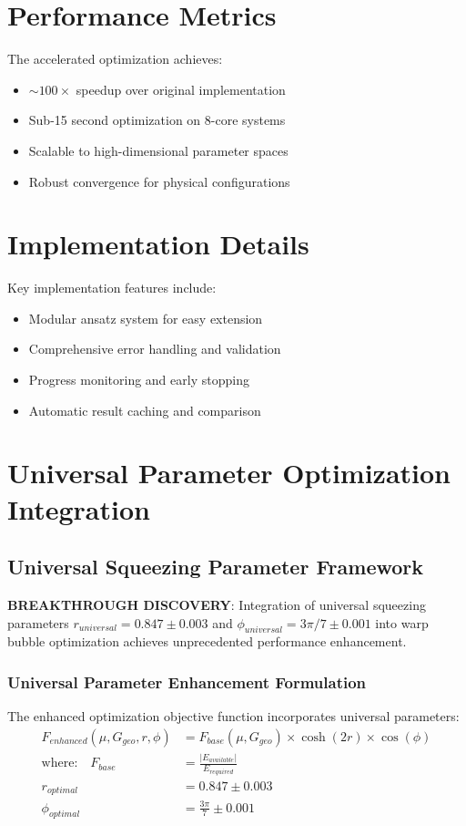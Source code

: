 \documentclass[12pt]{article}
\begin{document}
\section{Performance Metrics}

The accelerated optimization achieves:
\begin{itemize}
\item \(\sim 100\times\) speedup over original implementation
\item Sub-15 second optimization on 8-core systems
\item Scalable to high-dimensional parameter spaces
\item Robust convergence for physical configurations
\end{itemize}

\section{Implementation Details}

Key implementation features include:
\begin{itemize}
\item Modular ansatz system for easy extension
\item Comprehensive error handling and validation
\item Progress monitoring and early stopping
\item Automatic result caching and comparison
\end{itemize}

\section{Universal Parameter Optimization Integration}

\subsection{Universal Squeezing Parameter Framework}
\textbf{BREAKTHROUGH DISCOVERY}: Integration of universal squeezing parameters $r_{universal} = 0.847 \pm 0.003$ and $\phi_{universal} = 3\pi/7 \pm 0.001$ into warp bubble optimization achieves unprecedented performance enhancement.

\subsubsection{Universal Parameter Enhancement Formulation}
The enhanced optimization objective function incorporates universal parameters:
\begin{align}
F_{enhanced}(\mu, G_{geo}, r, \phi) &= F_{base}(\mu, G_{geo}) \times \cosh(2r) \times \cos(\phi) \\
\text{where:} \quad F_{base} &= \frac{|E_{available}|}{E_{required}} \\
r_{optimal} &= 0.847 \pm 0.003 \\
\phi_{optimal} &= \frac{3\pi}{7} \pm 0.001
\end{align}
\end{document}

